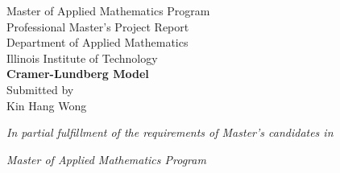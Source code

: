 \documentclass[12pt]{article}
\begin{document}
\begin{center}
{Master of Applied Mathematics Program}\\
{Professional Master's Project Report}\\
{Department of Applied Mathematics}\\
{Illinois Institute of Technology}\\
\vspace{4.5 cm}
{\Large \bf Cramer-Lundberg Model}\\
\vspace{4.5 cm} 
{\Large Submitted by}\\
\vspace{0.5 cm}
{\Large Kin Hang Wong}\\
\vspace{7cm} 
\centerline{\emph{In
partial fulfillment of the requirements of Master's candidates in}} 
\centerline{\emph{Master of Applied 
Mathematics Program}}
\vspace{.1in}

\vspace{.1in}
\end{center}
\thispagestyle{empty}
\newpage
\end{document}
